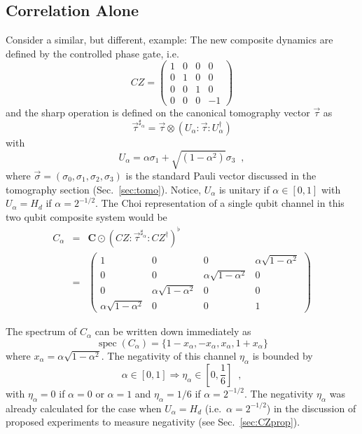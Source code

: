 \subsection{Correlation Alone}
Consider a similar, but different, example:  The new composite dynamics are defined by the controlled phase gate, i.e.\
$$
CZ = \begin{pmatrix}
1&0&0&0\\
0&1&0&0\\
0&0&1&0\\
0&0&0&-1
\end{pmatrix} 
$$
and the sharp operation is defined on the canonical tomography vector $\vec{\tau}$ as
$$
\vec{\tau}^{\sharp_\alpha} = \vec{\tau}\otimes\left(U_\alpha:\vec{\tau}:U_\alpha^\dagger\right)
$$
with
$$
U_\alpha = \alpha\sigma_1 + \sqrt{\left(1-\alpha^2\right)}\sigma_3\;\;,
$$
where $\vec{\sigma}=(\sigma_0,\sigma_1,\sigma_2,\sigma_3)$ is the standard Pauli vector discussed in the tomography section (Sec.\ \ref{sec:tomo}).  Notice, $U_\alpha$ is unitary if $\alpha\in[0,1]$ with $U_\alpha = H_d$ if $\alpha = 2^{-1/2}$.  The Choi representation of a single qubit channel in this two qubit composite system would be
\begin{eqnarray*}
C_\alpha &=& \mathbf{C}\odot\left(CZ:\vec{\tau}^{\sharp_\alpha}:CZ^\dagger\right)^\flat\\
&=& \begin{pmatrix}
 1 & 0 & 0 & \alpha \sqrt{1-\alpha^2} \\
 0 & 0 & \alpha \sqrt{1-\alpha^2} & 0 \\
 0 & \alpha \sqrt{1-\alpha^2} & 0 & 0 \\
 \alpha \sqrt{1-\alpha^2} & 0 & 0 & 1
\end{pmatrix}
\end{eqnarray*}

The spectrum of $C_\alpha$ can be written down immediately as
$$
\operatorname{spec}(C_\alpha) = \{1-x_\alpha,-x_\alpha,x_\alpha,1+x_\alpha\}
$$
where $x_\alpha = \alpha \sqrt{1-\alpha^2}$.  The negativity of this channel $\eta_\alpha$ is bounded by
$$
\alpha\in[0,1]\Rightarrow \eta_\alpha\in\left[0,\frac{1}{6}\right]\;\;,
$$
with $\eta_\alpha=0$ if $\alpha=0$ or $\alpha=1$ and $\eta_\alpha=1/6$ if $\alpha=2^{-1/2}$.  The negativity $\eta_\alpha$ was already calculated for the case when $U_\alpha=H_d$ (i.e.\ $\alpha=2^{-1/2}$) in the discussion of proposed experiments to measure negativity (see Sec.\ \ref{sec:CZprop}).

